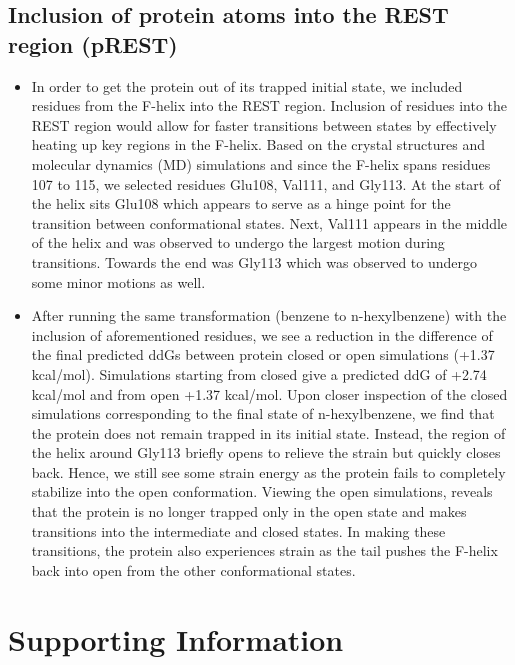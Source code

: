 \documentclass{article}
\begin{document}
\subsection{Inclusion of protein atoms into the REST region (pREST)}
   \begin{itemize}
   \item In order to get the protein out of its trapped initial state, we included residues from the F-helix into the REST region.
      Inclusion of residues into the REST region would allow for faster transitions between states by effectively heating up key regions in the F-helix.
      Based on the crystal structures and molecular dynamics (MD) simulations and since the F-helix spans residues 107 to 115, we selected residues Glu108, Val111, and Gly113.
      At the start of the helix sits Glu108 which appears to serve as a hinge point for the transition between conformational states. 
      Next, Val111 appears in the middle of the helix and was observed to undergo the largest motion during transitions. 
      Towards the end was Gly113 which was observed to undergo some minor motions as well.
   \item After running the same transformation (benzene to n-hexylbenzene) with the inclusion of aforementioned residues, 
      we see a reduction in the difference of the final predicted ddGs between protein closed or open simulations (+1.37 kcal/mol).
      Simulations starting from closed give a predicted ddG of +2.74 kcal/mol and from open +1.37 kcal/mol.
      Upon closer inspection of the closed simulations corresponding to the final state of n-hexylbenzene, we find that the protein does not remain trapped in its initial state.
      Instead, the region of the helix around Gly113 briefly opens to relieve the strain but quickly closes back. 
      Hence, we still see some strain energy as the protein fails to completely stabilize into the open conformation.
      Viewing the open simulations, reveals that the protein is no longer trapped only in the open state and makes transitions into the intermediate and closed states.
      In making these transitions, the protein also experiences strain as the tail pushes the F-helix back into open from the other conformational states.




   \end{itemize}



\section{Supporting Information}   
\end{document}
